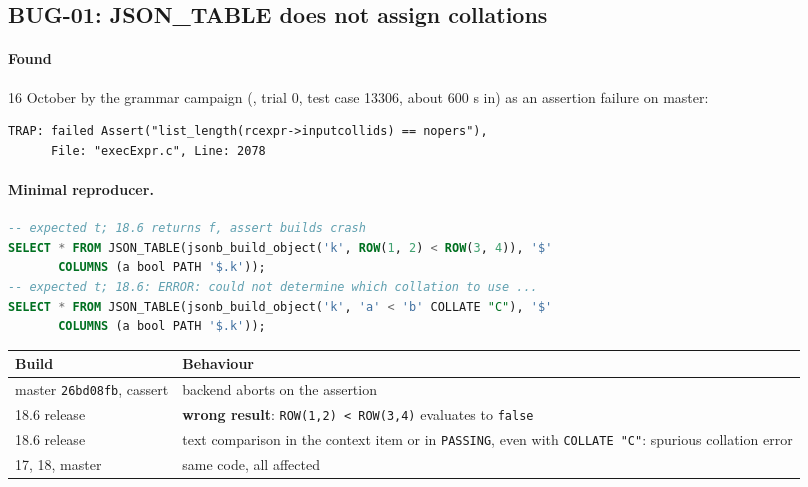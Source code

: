 \subsection{BUG-01: JSON\_TABLE does not assign collations}
\label{sec:bug01}

\paragraph{Found} 16 October by the grammar campaign (,
trial 0, test case 13306, about 600 s in) as an assertion failure on master:
\begin{lstlisting}
TRAP: failed Assert("list_length(rcexpr->inputcollids) == nopers"),
      File: "execExpr.c", Line: 2078
\end{lstlisting}

\paragraph{Minimal reproducer.}
\begin{lstlisting}[language=SQL]
-- expected t; 18.6 returns f, assert builds crash
SELECT * FROM JSON_TABLE(jsonb_build_object('k', ROW(1, 2) < ROW(3, 4)), '$'
       COLUMNS (a bool PATH '$.k'));
-- expected t; 18.6: ERROR: could not determine which collation to use ...
SELECT * FROM JSON_TABLE(jsonb_build_object('k', 'a' < 'b' COLLATE "C"), '$'
       COLUMNS (a bool PATH '$.k'));
\end{lstlisting}

\begin{center}
\small
\begin{tabularx}{\linewidth}{lX}
\toprule
Build & Behaviour \\
\midrule
master \texttt{26bd08fb}, cassert & backend aborts on the assertion \\
18.6 release & \textbf{wrong result}: \texttt{ROW(1,2) < ROW(3,4)} evaluates to \texttt{false} \\
18.6 release & text comparison in the context item or in \texttt{PASSING}, even with \texttt{COLLATE "C"}: spurious collation error \\
17, 18, master & same code, all affected \\
\bottomrule
\end{tabularx}
\end{center}

